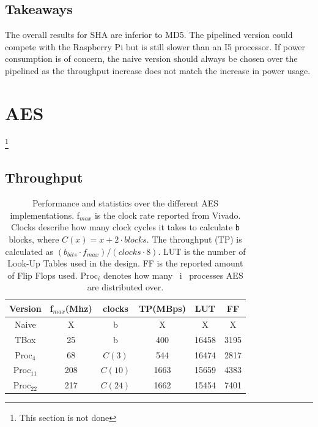 \documentclass[a4paper, openany]{book}
\begin{document}
\begin{abstact}
\subsection{Takeaways}
\label{sec:org9609bf2}
The overall results for SHA are inferior to MD5. The pipelined version could compete with the Raspberry Pi but is still slower than an I5 processor. If power consumption is of concern, the naive version should always be chosen over the pipelined as the throughput increase does not match the increase in power usage.
\section{AES}
\label{sec:orgbae1806}
\label{sec:AESperformance}
\footnote{This section is not done}
\subsection{Throughput}
\label{sec:org0b119b6}
\begin{table}[!htb]
\centering
\captionsetup{width=.8\linewidth}
\begin{tabular}{c c c c c c}
\hline
Version & f$_{max}$(Mhz) & clocks & TP(MBps) & LUT & FF\\
\hline
Naive      &   X & b          & X    & X     & X\\
TBox       &  25 & b           & 400 & 16458 & 3195\\
Proc$_{4}$  &  68 & $C(3)$ & 544 & 16474 & 2817\\
Proc$_{11}$ & 208 & $C(10)$ & 1663 & 15659 & 4383\\
Proc$_{22}$ & 217 & $C(24)$ & 1662 & 15454 & 7401\\
\end{tabular}
\caption[AES: FPGA Versions]%
{Performance and statistics over the different AES implementations. f$_{max}$ is the clock rate reported from Vivado. Clocks describe how many clock cycles it takes to calculate \texttt{b} blocks, where $C(x) = x+2 \cdot blocks$. The throughput (TP) is calculated as \((b_{bits}\cdot f_{max})/(clocks \cdot 8)\). LUT is the number of Look-Up Tables used in the design. FF is the reported amount of Flip Flops used. Proc$_{i}$ denotes how many ~i~ processes AES are distributed over.}
\label{tab:AESversions}
\end{table}

\end{abstact}
\end{document}
